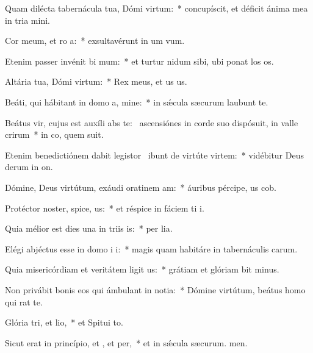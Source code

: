 \item Quam dilécta tabernácula tua, Dómi virtum:~* concupíscit, et déficit ánima mea in tria mini.
\item Cor meum, et ro a:~* exsultavérunt in um vum.
\item Etenim passer invénit bi mum:~* et turtur nidum sibi, ubi ponat los os.
\item Altária tua, Dómi virtum:~* Rex meus, et us us.
\item Beáti, qui hábitant in domo a, mine:~* in sǽcula sæcurum laubunt te.
\item Beátus vir, cujus est auxíli abs te:~\pscross{} ascensiónes in corde suo dispósuit, in valle crirum~* in co, quem suit.
\item Etenim benedictiónem dabit legistor~\pscross{} ibunt de virtúte  virtem:~* vidébitur Deus derum in on.
\item Dómine, Deus virtútum, exáudi oratinem am:~* áuribus pércipe, us cob.
\item Protéctor noster, spice, us:~* et réspice in fáciem ti i.
\item Quia mélior est dies una in triis is:~* per lia.
\item Elégi abjéctus esse in domo i i:~* magis quam habitáre in tabernáculis carum.
\item Quia misericórdiam et veritátem ligit us:~* grátiam et glóriam bit minus.
\item Non privábit bonis eos qui ámbulant in notia:~* Dómine virtútum, beátus homo qui rat  te.
\item Glória tri, et lio,~* et Spitui to.
\item Sicut erat in princípio, et , et per,~* et in sǽcula sæcurum. men.
